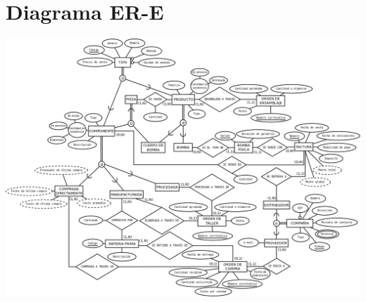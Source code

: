 \documentclass[]{report}
\begin{document}
	\chapter*{Diagrama ER-E}
	\begin{center}
		\includegraphics[width=\textwidth,height=\textheight,keepaspectratio]{DiagramFINAL}
	\end{center}
	
\end{document}
